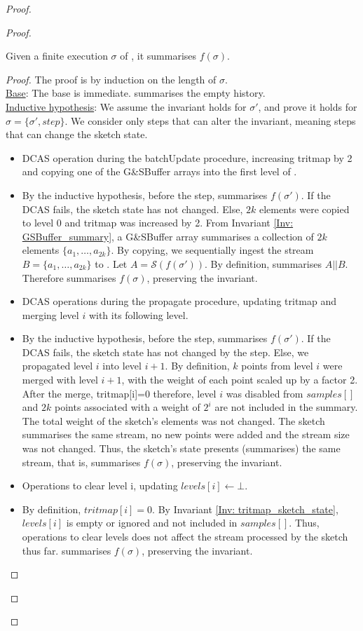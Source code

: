 \begin{proof}
\begin{proof}
\begin{invariant}\label{Inv: summary_history}
Given a finite execution $\sigma$ of \mysketch, it summarises \(f(\sigma)\).
\end{invariant}
\begin{proof}
The proof is by induction on the length of \(\sigma\).\\
\underline{Base}: The base is immediate. \mysketch summarises the empty history.\\
\underline{Inductive hypothesis}: We assume the invariant holds for \(\sigma'\), and prove it holds for \(\sigma = \{\sigma',step\}\). We consider only steps that can alter the invariant, meaning steps that can change the sketch state.
\begin{itemize}
    \item DCAS operation during the batchUpdate procedure, increasing tritmap by 2 and copying one of the G\&SBuffer arrays into the first level of \mysketch.
    \item[] By the inductive hypothesis, before the step, \mysketch summarises \(f(\sigma')\). If the DCAS fails, the sketch state has not changed. Else, $2k$ elements were copied to level 0 and tritmap was increased by 2. 
    From Invariant \ref{Inv: GSBuffer_summary}, a G\&SBuffer array summarises a collection of \(2k\) elements \(\{a_1,\dots,a_{2k}\}\). By copying, we sequentially ingest the stream \(B=\{a_1,\dots,a_{2k}\}\) to \mysketch. Let \(A=\mathcal{S}(f(\sigma'))\). By definition, \mysketch summarises \(A||B\). Therefore \mysketch summarises \(f(\sigma)\), preserving the invariant. 
    \item DCAS operations during the propagate procedure, updating tritmap and merging level \(i\) with its following level.
    \item[] By the inductive hypothesis, before the step, \mysketch summarises \(f(\sigma')\). If the DCAS fails, the sketch state has not changed by the step. Else, we propagated level \(i\) into level \(i+1\). By definition, \(k\) points from level \(i\) were merged with level \(i+1\), with the weight of each point scaled up by a factor 2. After the merge, tritmap[i]=0 therefore, level \(i\) was disabled from \(samples[]\) and \(2k\) points associated with a weight of \(2^i\) are not included in the summary. The total weight of the sketch's elements was not changed. The sketch summarises the same stream, no new points were added and the stream size was not changed. Thus, the sketch's state presents (summarises) the same stream, that is, \mysketch summarises \(f(\sigma)\), preserving the invariant. 
    \item Operations to clear level i, updating \(levels[i] \gets \bot\).
    \item[] By definition, \(tritmap[i] = 0\). By Invariant \ref{Inv: tritmap_sketch_state}, \(levels[i]\) is empty or ignored and not included in \(samples[]\). Thus, operations to clear levels does not affect the stream processed by the sketch thus far. \mysketch summarises \(f(\sigma)\), preserving the invariant.
\end{itemize}
\end{proof}


\end{proof}
\end{proof}

